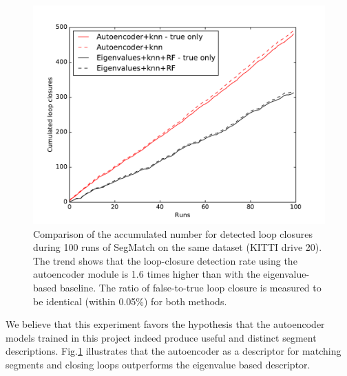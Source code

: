 \begin{figure}
  \centering
  \includegraphics[width=5.2in]{images/kitti20performance.pdf}
  \caption{Comparison of the accumulated number for detected loop closures during 100 runs of SegMatch on the same dataset (KITTI drive 20). The trend shows that the loop-closure detection rate using the autoencoder module is 1.6 times higher than with the eigenvalue-based baseline. The ratio of false-to-true loop closure is measured to be identical (within 0.05\%) for both methods.}
  \label{fig:kitti20_performance}
\end{figure}

We believe that this experiment favors the hypothesis that the autoencoder models trained in this project indeed produce useful and distinct segment descriptions. Fig.\ref{fig:kitti20_performance} illustrates that the autoencoder as a descriptor for matching segments and closing loops outperforms the eigenvalue based descriptor.\\
